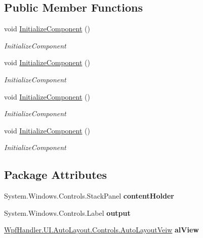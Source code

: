 \subsection*{Public Member Functions}
\begin{DoxyCompactItemize}
\item 
void \mbox{\hyperlink{class_text_filed_controls_1_1_main_window_a77c0faa0e8c0159b20a95cc0f38e6ca7}{Initialize\+Component}} ()
\begin{DoxyCompactList}\small\item\em Initialize\+Component \end{DoxyCompactList}\item 
void \mbox{\hyperlink{class_text_filed_controls_1_1_main_window_a77c0faa0e8c0159b20a95cc0f38e6ca7}{Initialize\+Component}} ()
\begin{DoxyCompactList}\small\item\em Initialize\+Component \end{DoxyCompactList}\item 
void \mbox{\hyperlink{class_text_filed_controls_1_1_main_window_a77c0faa0e8c0159b20a95cc0f38e6ca7}{Initialize\+Component}} ()
\begin{DoxyCompactList}\small\item\em Initialize\+Component \end{DoxyCompactList}\item 
void \mbox{\hyperlink{class_text_filed_controls_1_1_main_window_a77c0faa0e8c0159b20a95cc0f38e6ca7}{Initialize\+Component}} ()
\begin{DoxyCompactList}\small\item\em Initialize\+Component \end{DoxyCompactList}\end{DoxyCompactItemize}
\subsection*{Package Attributes}
\begin{DoxyCompactItemize}
\item 
\mbox{\label{class_text_filed_controls_1_1_main_window_a52515254440985d82571f707b6a65e1c}} 
System.\+Windows.\+Controls.\+Stack\+Panel {\bfseries content\+Holder}
\item 
\mbox{\label{class_text_filed_controls_1_1_main_window_a5783ca505879f332f89e59e7aa1c048d}} 
System.\+Windows.\+Controls.\+Label {\bfseries output}
\item 
\mbox{\label{class_text_filed_controls_1_1_main_window_ae1f61625d02a375737eaae9ba8207c38}} 
\mbox{\hyperlink{class_wpf_handler_1_1_u_i_1_1_auto_layout_1_1_controls_1_1_auto_layout_veiw}{Wpf\+Handler.\+U\+I.\+Auto\+Layout.\+Controls.\+Auto\+Layout\+Veiw}} {\bfseries al\+View}
\end{DoxyCompactItemize}
